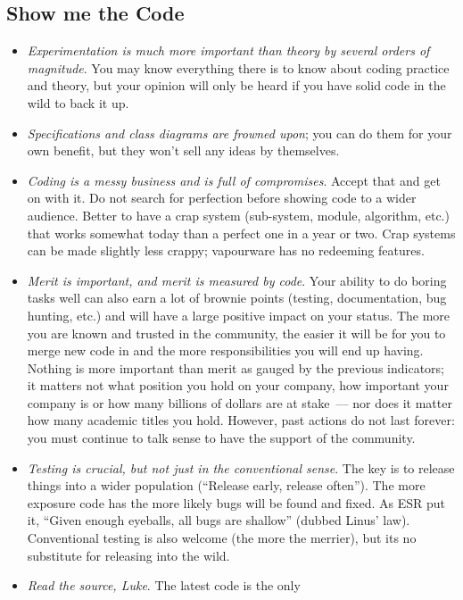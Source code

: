 \documentclass{book}
\begin{document}
\subsection{Show me the Code}

\begin{itemize}
\item \emph{Experimentation is much more important than theory by
  several orders of magnitude}. You may know everything there is to
  know about coding practice and theory, but your opinion will only be
  heard if you have solid code in the wild to back it up.
\item \emph{Specifications and class diagrams are frowned upon}; you
  can do them for your own benefit, but they won't sell any ideas by
  themselves.
\item \emph{Coding is a messy business and is full of
  compromises}. Accept that and get on with it. Do not search for
  perfection before showing code to a wider audience. Better to have a
  crap system (sub-system, module, algorithm, etc.) that works
  somewhat today than a perfect one in a year or two. Crap systems can
  be made slightly less crappy; vapourware has no redeeming features.
\item \emph{Merit is important, and merit is measured by code}. Your
  ability to do boring tasks well can also earn a lot of brownie
  points (testing, documentation, bug hunting, etc.) and will have a
  large positive impact on your status. The more you are known and
  trusted in the community, the easier it will be for you to merge new
  code in and the more responsibilities you will end up
  having. Nothing is more important than merit as gauged by the
  previous indicators; it matters not what position you hold on your
  company, how important your company is or how many billions of
  dollars are at stake~--- nor does it matter how many academic titles
  you hold. However, past actions do not last forever: you must
  continue to talk sense to have the support of the community.
\item \emph{Testing is crucial, but not just in the conventional
  sense}. The key is to release things into a wider population
  (``Release early, release often''). The more exposure code has the
  more likely bugs will be found and fixed. As ESR put it, ``Given
  enough eyeballs, all bugs are shallow'' (dubbed Linus'
  law). Conventional testing is also welcome (the more the merrier),
  but its no substitute for releasing into the wild.
\item \emph{Read the source, Luke}. The latest code is the only

\end{itemize}
\end{document}
